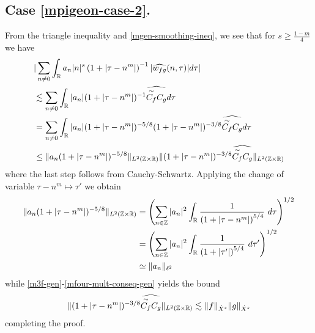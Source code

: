 \subsection{Case \texorpdfstring{\eqref{mpigeon-case-2}}{2}.} From the triangle inequality and
\eqref{mgen-smoothing-ineq}, we see that for $s \ge \frac{1-m}{4}$ we have
%
%
%
%
%
%
\begin{equation}
	\begin{split}
		& | \sum_{n \neq 0} \int_{\mathbb{R}} a_n |n|^s \left( 1 + | \tau - n^m | \right)^{-1} | 
		\widehat{w_{fg}}(n, \tau) | d \tau |
		\\
		& \lesssim \sum_{n \neq 0}  \int_{\mathbb{R}} |a_{n}| (1+ | \tau - n^m |)^{-1} \widehat{\overset{\sim}{C_f} C_g} d
		\tau
	\\	
	& = \sum_{n \neq 0} \int_{\mathbb{R}} |a_{n}| (1+ | \tau - n^m |)^{-5/8} (1 + | \tau - n^m
	|)^{-3/8} \widehat{\overset{\sim}{C_f} C_g} d
		\tau
		\\
		& \le \|a_{n} (1 + | \tau - n^m |)^{-5/8}\|_{L^2(\mathbb{Z} \times \mathbb{R})}  \| (1 +
		| \tau - n^m |)^{-3/8} \widehat{\overset{\sim}{C_f} C_g}  \|_{L^2(\mathbb{Z} \times
		\mathbb{R})}
		\end{split}
\end{equation}
%
%
where the last step follows from Cauchy-Schwartz. Applying the change of
variable $\tau - n^{m } \mapsto \tau'$ we obtain  %
\begin{equation*}
	\begin{split}
		\|a_{n} (1 + | \tau - n^m |)^{-5/8}\|_{L^2(\mathbb{Z} \times \mathbb{R})} 
		& = \left( \sum_{n \in \mathbb{Z}} | a_{n} |^2\int_{\mathbb{R}} \frac{1}{\left( 1 + | \tau -
		n^{m } | \right)^{5/4}} \ d \tau  
		\right)^{1/2} 
		\\
		& = \left ( \sum_{n \in \mathbb{Z}}
		| a_n |^2 
		\int_{\mathbb{R}} \frac{1}{\left( 1 + | \tau' | \right)^{5/4}} \ d 
		\tau' \right)^{1/2}
		\\
		& \simeq \|a_n\|_{\ell^2}
		\end{split}
\end{equation*}
%
%
%
while \eqref{m3f-gen}-\eqref{mfour-mult-conseq-gen} yields the bound
%
%
\begin{equation*}
	\begin{split}
	\| (1 + | \tau - n^m |)^{-3/8} \widehat{\overset{\sim}{C_f} C_g}  \|_{L^2(\mathbb{Z}
	\times \mathbb{R})} \lesssim \|f\|_{\dot{X}^s} \|g\|_{\dot{X}^s}
	\end{split}
\end{equation*}
%
%
completing the proof. \qquad \qedsymbol
%
%
%
